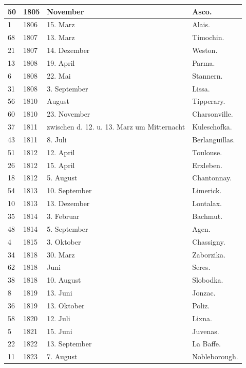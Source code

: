 \documentclass[a4paper, 11pt, oneside, polutonikogreek, german]{article}
\begin{document}
\begin{center}
\begin{longtable}{|p{6mm}|p{9mm}|p{60mm}|p{27mm}|}
        50 & 1805 & November & Asco. \\ \hline
        1 & 1806 & 15. Marz & Alais. \\ \hline
        68 & 1807 & 13. Marz & Timochin. \\ \hline
        21 & 1807 & 14. Dezember & Weston. \\ \hline
        13 & 1808 & 19. April & Parma. \\ \hline
        6 & 1808 & 22. Mai & Stannern. \\ \hline
        31 & 1808 & 3. September & Lissa. \\ \hline
        56 & 1810 & August & Tipperary. \\ \hline
        60 & 1810 & 23. November & Charsonville. \\ \hline
        37 & 1811 & zwischen d. 12. u. 13. Marz um Mitternacht & Kuleschofka. \\ \hline
        43 & 1811 & 8. Juli & Berlanguillas. \\ \hline
        51 & 1812 & 12. April & Toulouse. \\ \hline
        26 & 1812 & 15. April & Erxleben. \\ \hline
        18 & 1812 & 5. August & Chantonnay. \\ \hline
        54 & 1813 & 10. September & Limerick. \\ \hline
        10 & 1813 & 13. Dezember & Lontalax. \\ \hline
        35 & 1814 & 3. Februar & Bachmut. \\ \hline
        48 & 1814 & 5. September & Agen. \\ \hline
        4 & 1815 & 3. Oktober & Chassigny. \\ \hline
        34 & 1818 & 30. Marz & Zaborzika. \\ \hline
        62 & 1818 & Juni & Seres. \\ \hline
        38 & 1818 & 10. August & Slobodka. \\ \hline
        8 & 1819 & 13. Juni & Jonzac. \\ \hline
        36 & 1819 & 13. Oktober & Poliz. \\ \hline
        58 & 1820 & 12. Juli & Lixna. \\ \hline
        5 & 1821 & 15. Juni & Juvenas. \\ \hline
        22 & 1822 & 13. September & La Baffe. \\ \hline
        11 & 1823 & 7. August & Nobleborough. \\ \hline

\end{longtable}
\end{center}
\end{document}
